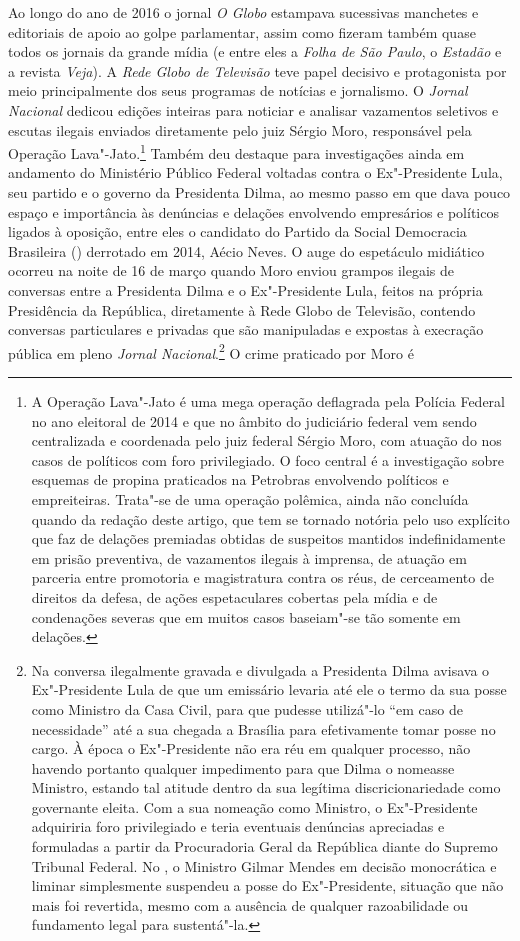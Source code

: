 Ao longo do ano de 2016 o jornal \emph{O Globo} estampava sucessivas manchetes
e editoriais de apoio ao golpe parlamentar, assim como fizeram também
quase todos os jornais da grande mídia (e entre eles a \emph{Folha de São
Paulo}, o \emph{Estadão} e a revista \emph{Veja}). A \emph{Rede Globo de Televisão} teve
papel decisivo e protagonista por meio principalmente dos seus programas
de notícias e jornalismo. O \emph{Jornal Nacional} dedicou edições inteiras
para noticiar e analisar vazamentos seletivos e escutas ilegais enviados
diretamente pelo juiz Sérgio Moro, responsável pela Operação
Lava"-Jato.\footnote{A Operação Lava"-Jato é uma mega operação deflagrada
  pela Polícia Federal no ano eleitoral de 2014 e que no âmbito do
  judiciário federal vem sendo centralizada e coordenada pelo juiz
  federal Sérgio Moro, com atuação do  nos casos de políticos com
  foro privilegiado. O foco central é a investigação sobre esquemas de
  propina praticados na Petrobras envolvendo políticos e empreiteiras.
  Trata"-se de uma operação polêmica, ainda não concluída quando da
  redação deste artigo, que tem se tornado notória pelo uso explícito
  que faz de delações premiadas obtidas de suspeitos mantidos
  indefinidamente em prisão preventiva, de vazamentos ilegais à
  imprensa, de atuação em parceria entre promotoria e magistratura
  contra os réus, de cerceamento de direitos da defesa, de ações
  espetaculares cobertas pela mídia e de condenações severas que em
  muitos casos baseiam"-se tão somente em delações.} Também deu destaque
para investigações ainda em andamento do Ministério Público Federal
voltadas contra o Ex"-Presidente Lula, seu partido e o governo da
Presidenta Dilma, ao mesmo passo em que dava pouco espaço e importância
às denúncias e delações envolvendo empresários e políticos ligados
à oposição, entre eles o candidato do Partido da Social
Democracia Brasileira () derrotado em 2014,
Aécio Neves. O auge do espetáculo
midiático ocorreu na noite de 16 de março quando Moro enviou grampos
ilegais de conversas entre a Presidenta Dilma e o Ex"-Presidente Lula,
feitos na própria Presidência da República, diretamente à Rede Globo de
Televisão, contendo conversas particulares e privadas que são
manipuladas e expostas à execração pública em pleno \emph{Jornal
Nacional}.\footnote{Na conversa ilegalmente gravada e divulgada a
  Presidenta Dilma avisava o Ex"-Presidente Lula de que um emissário
  levaria até ele o termo da sua posse como Ministro da Casa Civil, para
  que pudesse utilizá"-lo ``em caso de necessidade'' até a sua chegada a
  Brasília para efetivamente tomar posse no cargo. À época o
  Ex"-Presidente não era réu em qualquer processo, não havendo portanto
  qualquer impedimento para que Dilma o nomeasse Ministro, estando tal
  atitude dentro da sua legítima discricionariedade como governante
  eleita. Com a sua nomeação como Ministro, o Ex"-Presidente adquiriria
  foro privilegiado e teria eventuais denúncias apreciadas e formuladas
  a partir da Procuradoria Geral da República diante do Supremo Tribunal
  Federal. No , o Ministro Gilmar Mendes em decisão monocrática e
  liminar simplesmente suspendeu a posse do Ex"-Presidente, situação que
  não mais foi revertida, mesmo com a ausência de qualquer razoabilidade
  ou fundamento legal para sustentá"-la.} O crime praticado por Moro é

